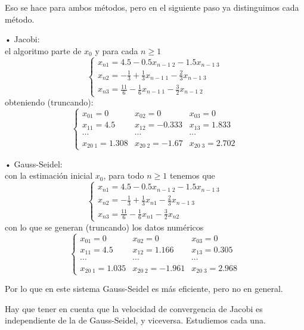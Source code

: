 \begin{ejemplo}
Eso se hace para ambos métodos, pero en el siguiente paso ya distinguimos cada método.
	\begin{nlist}
	\item[•] Jacobi:\\
	el algoritmo parte de $x_0$ y para cada $n \geq 1$
	\[ \left\{ \begin{array}{c}
	x_{n1} = 4.5 - 0.5x_{n-1 \; 2} - 1.5x_{n-1 \; 3} \\
	x_{n2} = - \frac{1}{3} + \frac{1}{3} x_{n-1 \; 1} - \frac{2}{3} x_{n-1 \; 3} \\
	x_{n3} = \frac{11}{6} - \frac{1}{6} x_{n-1 \; 1} - \frac{3}{2} x_{n-1 \; 2}
	\end{array}
	\right. \]
	obteniendo (truncando):
	\[
	\left\{ \begin{array}{lll}
	x_{01} = 0 & x_{02} = 0 & x_{03} = 0 \\
	x_{11} = 4.5 & x_{12} = -0.333 & x_{13} = 1.833 \\
	\cdots & \cdots & \cdots \\
	x_{20 \; 1} = 1.308 & x_{20 \; 2} = -1.67 & x_{20 \; 3} = 2.702
	\end{array}
	\right.
	\]	
	\item[•] Gauss-Seidel:\\
	con la estimación inicial $x_0$, para todo $n \geq 1$ tenemos que
	\[ \left\{ \begin{array}{c}
	x_{n1} = 4.5 - 0.5x_{n-1 \; 2} - 1.5x_{n-1 \; 3} \\
	x_{n2} = - \frac{1}{3} + \frac{1}{3} x_{n1} - \frac{2}{3} x_{n-1 \; 3} \\
	x_{n3} = \frac{11}{6} - \frac{1}{6} x_{n1} - \frac{3}{2} x_{n2}
	\end{array}
	\right. \]
	con lo que se generan (truncando) los datos numéricos
	\[
	\left\{ \begin{array}{lll}
	x_{01} = 0 & x_{02} = 0 & x_{03} = 0 \\
	x_{11} = 4.5 & x_{12} = 1.166 & x_{13} = 0.305 \\
	\cdots & \cdots & \cdots \\
	x_{20 \; 1} = 1.035 & x_{20 \; 2} = -1.961 & x_{20 \; 3} = 2.968
	\end{array}
	\right.
	\]	
	\end{nlist}
Por lo que en este sistema Gauss-Seidel es más eficiente, pero no en general.
\end{ejemplo}

Hay que tener en cuenta que la velocidad de convergencia de Jacobi es independiente de la de Gauss-Seidel, y viceversa. Estudiemos cada una.

